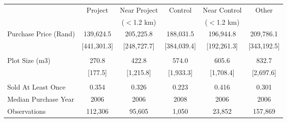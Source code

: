 \begin{tabu}{lccccc}
\toprule
 & Project       & Near Project       & Control        & Near Control       & Other     \\
 &        & ($<$1.2 km)       &        & ($<$1.2 km)       &      \\
\midrule
 Purchase Price (Rand)  & 139,624.5  & 205,225.8  & 188,031.5  & 196,944.8  & 209,786.1  \\ 
\rowfont{\footnotesize} & [441,301.3]  & [248,727.7]  & [384,039.4]  & [192,261.3]  & [343,192.5]  \\ 
 &  &  &  &  &  \\ 
 Plot Size (m3)  & 270.8  & 422.8  & 574.0  & 605.6  & 832.7  \\ 
\rowfont{\footnotesize} & [177.5]  & [1,215.8]  & [1,933.3]  & [1,708.4]  & [2,697.6]  \\ 
 &  &  &  &  &  \\ 
 Sold At Least Once  & 0.354  & 0.326  & 0.223  & 0.416  & 0.301  \\ 
 Median Purchase Year  & 2006  & 2006  & 2008  & 2006  & 2006  \\ 
\midrule
 Observations  & 112,306  & 95,605  & 1,050  & 23,852  & 157,869  \\ 
\bottomrule
\end{tabu}
